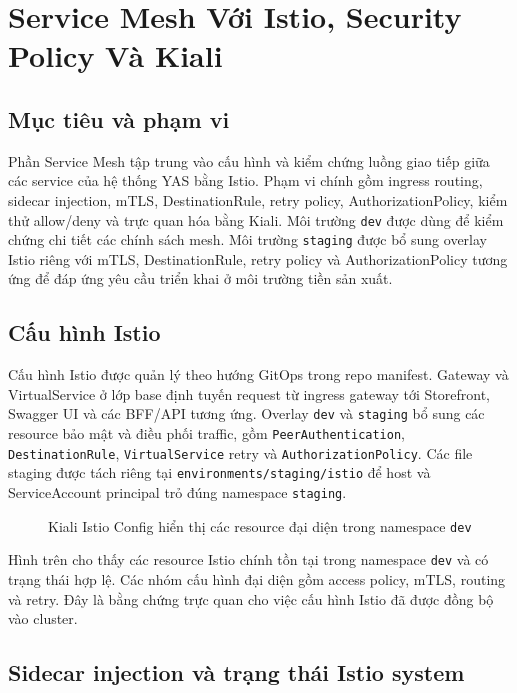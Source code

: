 \section{Service Mesh Với Istio, Security Policy Và Kiali}

\subsection{Mục tiêu và phạm vi}

Phần Service Mesh tập trung vào cấu hình và kiểm chứng luồng giao tiếp giữa các service của hệ thống YAS bằng Istio. Phạm vi chính gồm ingress routing, sidecar injection, mTLS, DestinationRule, retry policy, AuthorizationPolicy, kiểm thử allow/deny và trực quan hóa bằng Kiali. Môi trường \texttt{dev} được dùng để kiểm chứng chi tiết các chính sách mesh. Môi trường \texttt{staging} được bổ sung overlay Istio riêng với mTLS, DestinationRule, retry policy và AuthorizationPolicy tương ứng để đáp ứng yêu cầu triển khai ở môi trường tiền sản xuất.

\subsection{Cấu hình Istio}

Cấu hình Istio được quản lý theo hướng GitOps trong repo manifest. Gateway và VirtualService ở lớp base định tuyến request từ ingress gateway tới Storefront, Swagger UI và các BFF/API tương ứng. Overlay \texttt{dev} và \texttt{staging} bổ sung các resource bảo mật và điều phối traffic, gồm \texttt{PeerAuthentication}, \texttt{DestinationRule}, \texttt{VirtualService} retry và \texttt{AuthorizationPolicy}. Các file staging được tách riêng tại \texttt{environments/staging/istio} để host và ServiceAccount principal trỏ đúng namespace \texttt{staging}.

\begin{figure}[H]
\centering
{}
\caption{Kiali Istio Config hiển thị các resource đại diện trong namespace \texttt{dev}}
\end{figure}

Hình trên cho thấy các resource Istio chính tồn tại trong namespace \texttt{dev} và có trạng thái hợp lệ. Các nhóm cấu hình đại diện gồm access policy, mTLS, routing và retry. Đây là bằng chứng trực quan cho việc cấu hình Istio đã được đồng bộ vào cluster.

\subsection{Sidecar injection và trạng thái Istio system}

